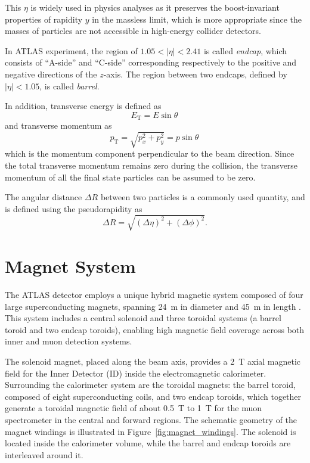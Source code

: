This \(\eta\) is widely used in physics analyses as it preserves the boost-invariant properties of rapidity \(y\) in the massless limit, which is more appropriate since the masses of particles are not accessible in high-energy collider detectors.

In ATLAS experiment, the region of $1.05 < |\eta| < 2.41$ is called \textit{endcap}, which consists of ``A-side'' and ``C-side'' corresponding respectively to the positive and negative directions of the \(z\)-axis. The region between two endcaps, defined by $|\eta| < 1.05$, is called \textit{barrel}.

In addition, transverse energy is defined as 
\[
  E_{\mathrm{T}} = E \sin \theta\,
\]
and transverse momentum as
\[
  p_{\mathrm{T}} = \sqrt{p_x^2 + p_y^2} = p \sin \theta\,
\]
which is the momentum component perpendicular to the beam direction. Since the total transverse momentum remains zero during the collision, the transverse momentum of all the final state particles can be assumed to be zero.

The angular distance \(\Delta R\) between two particles is a commonly used quantity, and is defined using the pseudorapidity as
\begin{equation}
  \Delta R = \sqrt{(\Delta \eta)^2 + (\Delta \phi)^2}.
  \label{eq:deltaR}
\end{equation}
\section{Magnet System} \label{sec:MagnetSystem}
The ATLAS detector employs a unique hybrid magnetic system composed of four large superconducting magnets, spanning 24~m in diameter and 45~m in length \cite{ATLASDetector2008}. This system includes a central solenoid and three toroidal systems (a barrel toroid and two endcap toroids), enabling high magnetic field coverage across both inner and muon detection systems.

The solenoid magnet, placed along the beam axis, provides a 2~T axial magnetic field for the Inner Detector (ID) inside the electromagnetic calorimeter. Surrounding the calorimeter system are the toroidal magnets: the barrel toroid, composed of eight superconducting coils, and two endcap toroids, which together generate a toroidal magnetic field of about 0.5~T to 1~T for the muon spectrometer in the central and forward regions. The schematic geometry of the magnet windings is illustrated in Figure~\ref{fig:magnet_windings}. The solenoid is located inside the calorimeter volume, while the barrel and endcap toroids are interleaved around it. 

